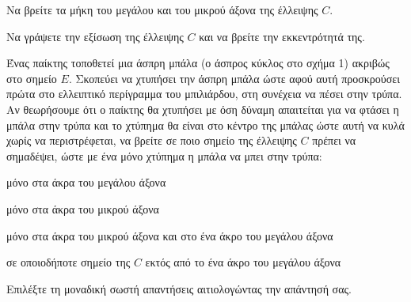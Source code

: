 \begin{alist}
    \item Να βρείτε τα μήκη του μεγάλου και του μικρού άξονα της έλλειψης $C$. 
    \item Να γράψετε την εξίσωση της έλλειψης $C$ και να βρείτε την εκκεντρότητά της. 
    \item Ένας παίκτης τοποθετεί μια άσπρη μπάλα (ο άσπρος κύκλος στο σχήμα 1) ακριβώς στο σημείο $E$. Σκοπεύει να χτυπήσει την άσπρη μπάλα ώστε αφού αυτή προσκρούσει πρώτα στο ελλειπτικό περίγραμμα του μπιλιάρδου, στη συνέχεια να πέσει στην τρύπα. Αν θεωρήσουμε ότι ο παίκτης θα χτυπήσει με όση δύναμη απαιτείται για να φτάσει η μπάλα στην τρύπα και το χτύπημα θα είναι στο κέντρο της μπάλας ώστε αυτή να κυλά χωρίς να περιστρέφεται, να βρείτε σε ποιο σημείο της έλλειψης $C$ πρέπει να σημαδέψει, ώστε με ένα μόνο χτύπημα η μπάλα να μπει στην τρύπα:
    \begin{rlist}
        \item μόνο στα άκρα του μεγάλου άξονα
        \item μόνο στα άκρα του μικρού άξονα
        \item μόνο στα άκρα του μικρού άξονα και στο ένα άκρο του μεγάλου άξονα
        \item σε οποιοδήποτε σημείο της $C$ εκτός από το ένα άκρο του μεγάλου άξονα
    \end{rlist}
    Επιλέξτε τη μοναδική σωστή απαντήσεις αιτιολογώντας την απάντησή σας. 
\end{alist}